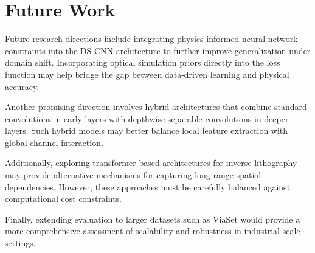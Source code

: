 \documentclass[conference]{IEEEtran}
\begin{document}
\section{\textbf{Future Work}}

Future research directions include integrating physics-informed neural network constraints into the DS-CNN architecture to further improve generalization under domain shift. Incorporating optical simulation priors directly into the loss function may help bridge the gap between data-driven learning and physical accuracy.

Another promising direction involves hybrid architectures that combine standard convolutions in early layers with depthwise separable convolutions in deeper layers. Such hybrid models may better balance local feature extraction with global channel interaction.

Additionally, exploring transformer-based architectures for inverse lithography may provide alternative mechanisms for capturing long-range spatial dependencies. However, these approaches must be carefully balanced against computational cost constraints.

Finally, extending evaluation to larger datasets such as ViaSet would provide a more comprehensive assessment of scalability and robustness in industrial-scale settings.
\end{document}
